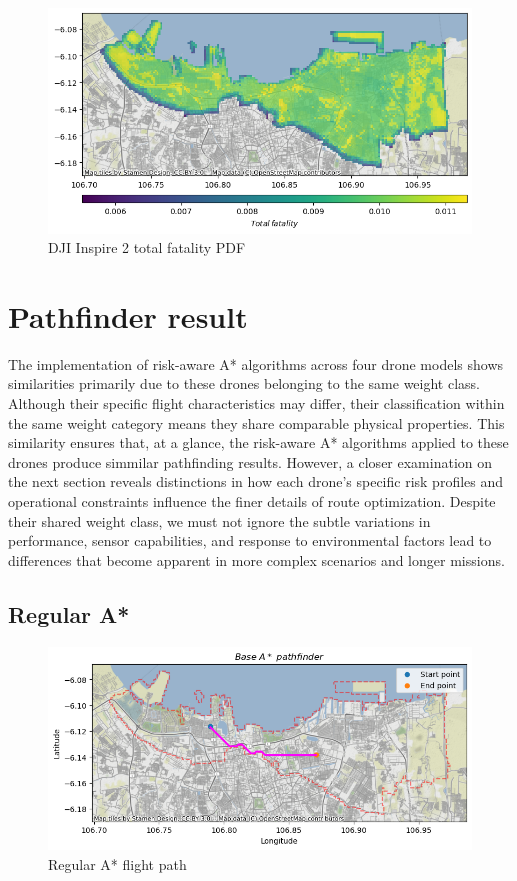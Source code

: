 \documentclass[12pt]{report}
\begin{document}
        \begin{figure}[H]
            \centering
            \includegraphics[width=\textwidth]{Plot/inspire/total_fatality_pdf.png}
            \caption{DJI Inspire 2 total fatality PDF}
        \end{figure}

    \section{Pathfinder result}
        The implementation of risk-aware A* algorithms across four drone models shows similarities primarily due to
        these drones belonging to the same weight class. Although their specific flight characteristics may differ,
        their classification within the same weight category means they share comparable physical properties. This
        similarity ensures that, at a glance, the risk-aware A* algorithms applied to these drones produce simmilar
        pathfinding results. However, a closer examination on the next section reveals distinctions in how each drone's
        specific risk profiles and operational constraints influence the finer details of route optimization. Despite
        their shared weight class, we must not ignore the subtle variations in performance, sensor capabilities, and
        response to environmental factors lead to differences that become apparent in more complex scenarios and longer
        missions.
        
        \label{fig:regularastar}
        \subsection{Regular A*}
        \begin{figure}[H]
            \centering
            \includegraphics[width=\textwidth]{Plot/base_a_star.png}
            \caption{Regular A* flight path}
        \end{figure}
\end{document}
